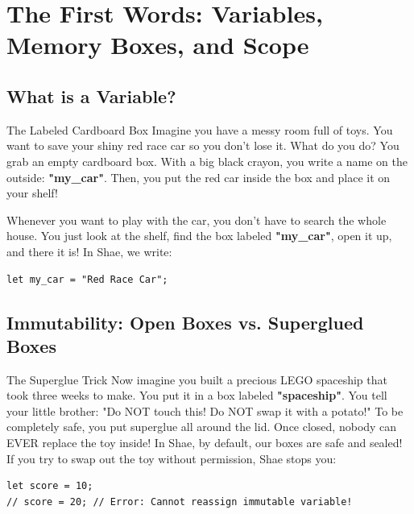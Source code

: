 \chapter{The First Words: Variables, Memory Boxes, and Scope}

\section{What is a Variable?}

\begin{kidbox}{The Labeled Cardboard Box}
Imagine you have a messy room full of toys. You want to save your shiny red race car so you don't lose it.
What do you do? You grab an empty cardboard box.
With a big black crayon, you write a name on the outside: \textbf{"my\_car"}.
Then, you put the red car inside the box and place it on your shelf!

Whenever you want to play with the car, you don't have to search the whole house. You just look at the shelf, find the box labeled \textbf{"my\_car"}, open it up, and there it is!
In Shae, we write:
\begin{lstlisting}[language=shaelang]
let my_car = "Red Race Car";
\end{lstlisting}
\end{kidbox}

\section{Immutability: Open Boxes vs. Superglued Boxes}

\begin{kidbox}{The Superglue Trick}
Now imagine you built a precious LEGO spaceship that took three weeks to make. You put it in a box labeled \textbf{"spaceship"}.
You tell your little brother: "Do NOT touch this! Do NOT swap it with a potato!"
To be completely safe, you put superglue all around the lid. Once closed, nobody can EVER replace the toy inside!
In Shae, by default, our boxes are safe and sealed! If you try to swap out the toy without permission, Shae stops you:
\begin{lstlisting}[language=shaelang]
let score = 10;
// score = 20; // Error: Cannot reassign immutable variable!
\end{lstlisting}
\end{kidbox}

